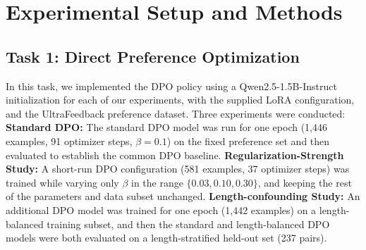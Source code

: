 \documentclass{article}
\begin{document}

\section{Experimental Setup and Methods}
\label{sec:methods}

\subsection{Task 1: Direct Preference Optimization }
\label{subsec:methods-task1}
 In this task, we implemented the DPO policy\citep{rafailov2023dpo} using a Qwen2.5-1.5B-Instruct initialization for each of our experiments, with the supplied LoRA configuration, and the UltraFeedback preference dataset. Three experiments were conducted: \noindent\textbf{Standard DPO:} The standard DPO model was run for one epoch (1,446 examples, 91 optimizer steps, $\beta = 0.1$) on the fixed preference set and then evaluated to establish the common DPO baseline. \noindent\textbf{Regularization-Strength Study:} A short-run DPO configuration (581 examples, 37 optimizer steps) was trained while varying only $\beta$ in the range $\{0.03, 0.10, 0.30\}$, and keeping the rest of the parameters and data subset unchanged. \noindent\textbf{Length-confounding Study:} An additional DPO model was trained for one epoch (1,442 examples) on a length-balanced training subset, and then the standard and length-balanced DPO models were both evaluated on a length-stratified held-out set (237 pairs).
\end{document}
